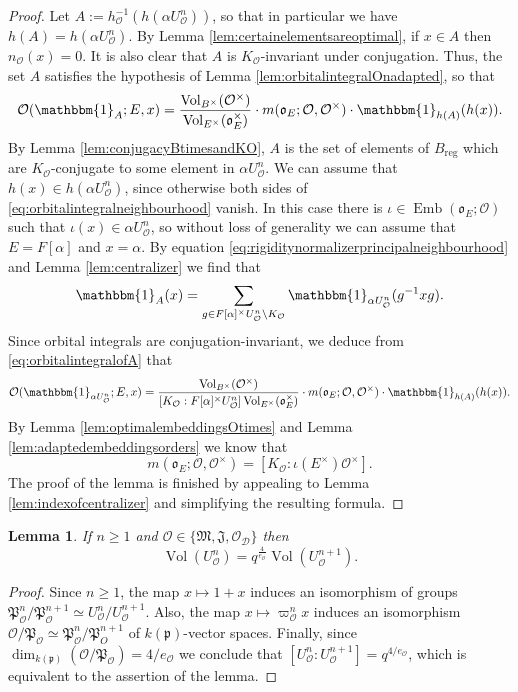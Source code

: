 \documentclass{article}
\newtheorem{lem}{Lemma}[section]
\theoremstyle{named}
\newcommand{\D}{\mathcal{D}}
\newcommand{\M}{\mathfrak{M}}
\newcommand{\J}{\mathfrak{J}}
\renewcommand{\O}{\mathcal{O}}
\renewcommand{\o}{\mathfrak{o}}
\renewcommand{\P}{\mathfrak{P}}
\newcommand{\p}{\mathfrak{p}}
\DeclareMathOperator{\vol}{Vol}
\DeclareMathOperator{\reg}{reg}
\DeclareMathOperator{\Emb}{Emb}
\begin{document}
\begin{proof}
Let $A := h_\O^{-1}(h(\alpha U_\O^n))$, so that in particular we have $h(A) = h(\alpha U_\O^n)$. By Lemma \ref{lem:certainelementsareoptimal}, if $x \in A$ then $n_\O(x) = 0$. It is also clear that $A$ is $K_\O$-invariant under conjugation. Thus, the set $A$ satisfies the hypothesis of Lemma \ref{lem:orbitalintegralOnadapted}, so that 
\begin{equation}\label{eq:orbitalintegralofA}
\O(\mathbbm{1}_A; E, x) = \frac{\vol_{B^\times}(\O^\times)}{\vol_{E^\times}(\o_E^\times)}\cdot m(\o_{E}; \O, \O^\times) \cdot \mathbbm{1}_{h(A)}(h(x)).
\end{equation} 
By Lemma \ref{lem:conjugacyBtimesandKO}, $A$ is the set of elements of $B_{\reg}$ which are $K_\O$-conjugate to some element in $\alpha U_\O^n$. We can assume that $h(x) \in h(\alpha U_\O^n)$, since otherwise both sides of \eqref{eq:orbitalintegralneighbourhood} vanish. In this case there is $\iota \in \Emb(\o_E; \O)$ such that $\iota(x) \in \alpha U_\O^n$, so without loss of generality we can assume that $E = F[\alpha]$ and $x = \alpha$. By equation \eqref{eq:rigiditynormalizerprincipalneighbourhood} and Lemma \ref{lem:centralizer} we find that
\begin{equation*}
    \mathbbm{1}_{A}(x) = \sum_{g \in F[\alpha]^\times U_\O^n \backslash K_\O} \mathbbm{1}_{\alpha U_\O^n}(g^{-1}xg).
\end{equation*}
Since orbital integrals are conjugation-invariant, we deduce from \eqref{eq:orbitalintegralofA} that 
\begin{equation}\label{auxeq:orbitalintegralneighbourhood}
\O(\mathbbm{1}_{\alpha U_\O^n}; E, x) =  \frac{\vol_{B^\times}(\O^\times)}{[K_\O: F[\alpha]^\times U_\O^n]\vol_{E^\times}(\o_E^\times)}\cdot m(\o_{E}; \O, \O^\times) \cdot \mathbbm{1}_{h(A)}(h(x)).
\end{equation}
By Lemma \ref{lem:optimalembeddingsOtimes} and Lemma \ref{lem:adaptedembeddingsorders} we know that
\begin{equation*}
    m(\o_E; \O, \O^\times) = [K_\O: \iota(E^\times)\O^\times]. 
\end{equation*}
The proof of the lemma is finished by appealing to Lemma \ref{lem:indexofcentralizer} and simplifying the resulting formula. 
\end{proof}

\begin{lem}\label{lem:volumeprincipalsubgroups}
If $n \geq 1$ and $\O \in \{\M, \J, \O_\D\}$ then
\begin{equation*}
    \vol(U_\O^n) = q^{\frac{4}{e_\O}}\vol(U_\O^{n + 1}).
\end{equation*}    
\end{lem}
\begin{proof}
Since $n \geq 1$, the map $x \mapsto 1 + x$ induces an isomorphism of groups $\P_\O^{n}/\P_\O^{n + 1} \simeq U^{n}_\O/ U^{n + 1}_\O$. Also, the map $x \mapsto \varpi_\O^n x$ induces an isomorphism $\O/\P_\O \simeq \P_\O^{n}/\P_{O}^{n+1}$ of $k(\p)$-vector spaces. Finally, since $\dim_{k(\p)}(\O/\P_\O) = 4/e_\O$ we conclude that $[U^{n}_\O: U^{n + 1}_\O] = q^{4/e_\O}$, which is equivalent to the assertion of the lemma.
\end{proof}
\end{document}
